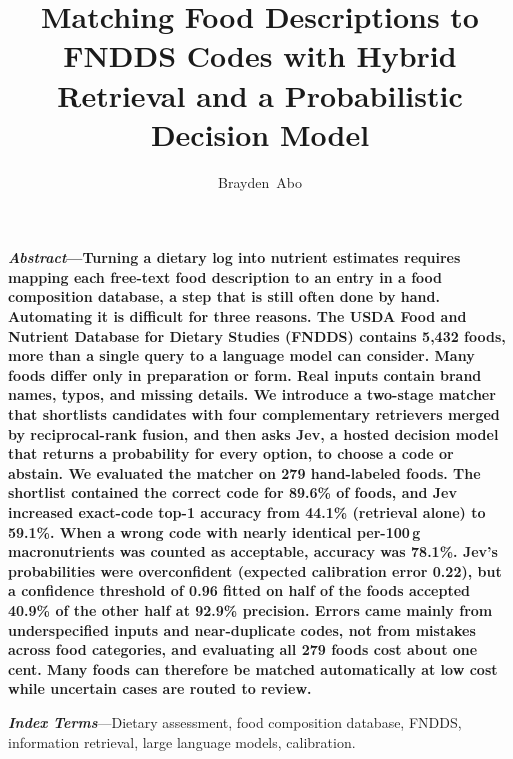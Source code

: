 \documentclass[11pt,journal,onecolumn]{IEEEtran}
\begin{document}
\title{Matching Food Descriptions to FNDDS Codes with Hybrid Retrieval and a Probabilistic Decision Model}
\author{Brayden~Abo}
\maketitle

\begin{center}\begin{minipage}{0.92\linewidth}\small\noindent
{\bfseries\itshape Abstract}{\bfseries ---Turning a dietary log into nutrient estimates requires mapping each free-text food description to an entry in a food composition database, a step that is still often done by hand. Automating it is difficult for three reasons. The USDA Food and Nutrient Database for Dietary Studies (FNDDS) contains 5,432 foods, more than a single query to a language model can consider. Many foods differ only in preparation or form. Real inputs contain brand names, typos, and missing details. We introduce a two-stage matcher that shortlists candidates with four complementary retrievers merged by reciprocal-rank fusion, and then asks Jev, a hosted decision model that returns a probability for every option, to choose a code or abstain. We evaluated the matcher on 279 hand-labeled foods. The shortlist contained the correct code for 89.6\% of foods, and Jev increased exact-code top-1 accuracy from 44.1\% (retrieval alone) to 59.1\%. When a wrong code with nearly identical per-100\,g macronutrients was counted as acceptable, accuracy was 78.1\%. Jev's probabilities were overconfident (expected calibration error 0.22), but a confidence threshold of 0.96 fitted on half of the foods accepted 40.9\% of the other half at 92.9\% precision. Errors came mainly from underspecified inputs and near-duplicate codes, not from mistakes across food categories, and evaluating all 279 foods cost about one cent. Many foods can therefore be matched automatically at low cost while uncertain cases are routed to review.}

\medskip\noindent
{\bfseries\itshape Index Terms}---Dietary assessment, food composition database, FNDDS, information retrieval, large language models, calibration.
\end{minipage}\end{center}
\end{document}
